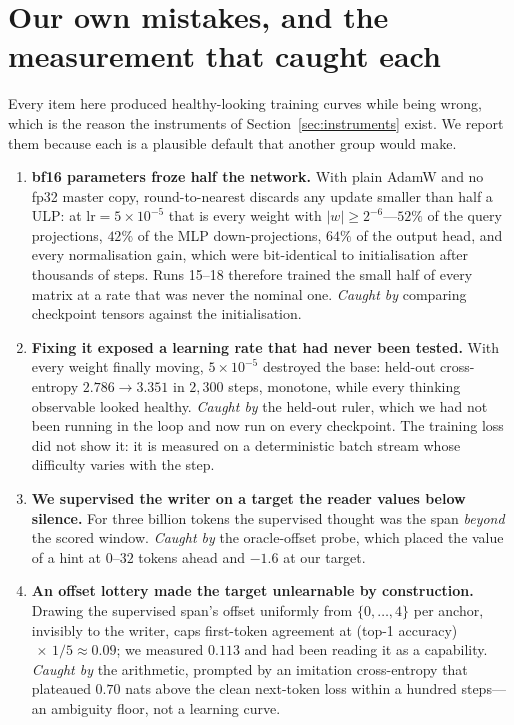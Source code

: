 \documentclass{article} %
\begin{document}
\section{Our own mistakes, and the measurement that caught each}
\label{sec:mistakes}

Every item here produced healthy-looking training curves while being wrong, which is the reason the instruments of Section~\ref{sec:instruments} exist. We report them because each is a plausible default that another group would make.

\begin{enumerate}
\item \textbf{bf16 parameters froze half the network.} With plain AdamW and no fp32 master copy, round-to-nearest discards any update smaller than half a ULP: at $\mathrm{lr}=5\times10^{-5}$ that is every weight with $|w| \ge 2^{-6}$---$52\%$ of the query projections, $42\%$ of the MLP down-projections, $64\%$ of the output head, and every normalisation gain, which were bit-identical to initialisation after thousands of steps. Runs 15--18 therefore trained the small half of every matrix at a rate that was never the nominal one. \emph{Caught by} comparing checkpoint tensors against the initialisation.
\item \textbf{Fixing it exposed a learning rate that had never been tested.} With every weight finally moving, $5\times10^{-5}$ destroyed the base: held-out cross-entropy $2.786 \to 3.351$ in $2{,}300$ steps, monotone, while every thinking observable looked healthy. \emph{Caught by} the held-out ruler, which we had not been running in the loop and now run on every checkpoint. The training loss did not show it: it is measured on a deterministic batch stream whose difficulty varies with the step.
\item \textbf{We supervised the writer on a target the reader values below silence.} For three billion tokens the supervised thought was the span \emph{beyond} the scored window. \emph{Caught by} the oracle-offset probe, which placed the value of a hint at $0$--$32$ tokens ahead and $-1.6$ at our target.
\item \textbf{An offset lottery made the target unlearnable by construction.} Drawing the supervised span's offset uniformly from $\{0,\dots,4\}$ per anchor, invisibly to the writer, caps first-token agreement at (top-1 accuracy)$\,\times\,1/5 \approx 0.09$; we measured $0.113$ and had been reading it as a capability. \emph{Caught by} the arithmetic, prompted by an imitation cross-entropy that plateaued $0.70$ nats above the clean next-token loss within a hundred steps---an ambiguity floor, not a learning curve.

\end{enumerate}
\end{document}
